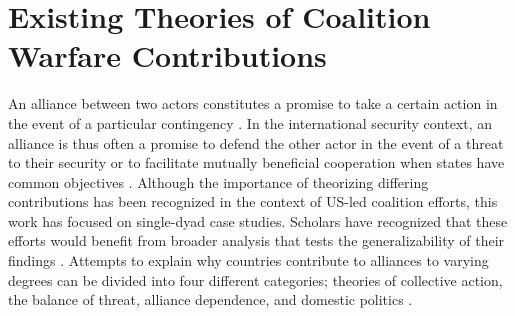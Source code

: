 \documentclass[12pt,letterpaper]{article}
\begin{document}
\section{Existing Theories of Coalition Warfare Contributions}
	An alliance between two actors constitutes a promise to take a certain action in the event of a particular contingency \citep[526]{altfeld_decisionallytheory_1984}. In the international security context, an alliance is thus often a promise to defend the other actor in the event of a threat to their security \citep{waltz_theoryinternationalpolitics_1979, walt_originsalliance_1987} or to facilitate mutually beneficial cooperation when states have common objectives \citep{keohane_hegemonycooperationdiscord_1984, wolford_showingrestraintsignaling_2014}. Although the importance of theorizing differing contributions has been recognized in the context of US-led coalition efforts, this work has focused on single-dyad case studies. Scholars have recognized that these efforts would benefit from broader analysis that tests the generalizability of their findings \citep[4-5]{mello_politicsmultinationalmilitary_2018}. Attempts to explain why countries contribute to alliances to varying degrees can be divided into four different categories; theories of collective action, the balance of threat, alliance dependence, and domestic politics \citep{bennett_burdensharingpersiangulf_1994, haesebrouck_democraticparticipationair_2016}.
	
\end{document}
